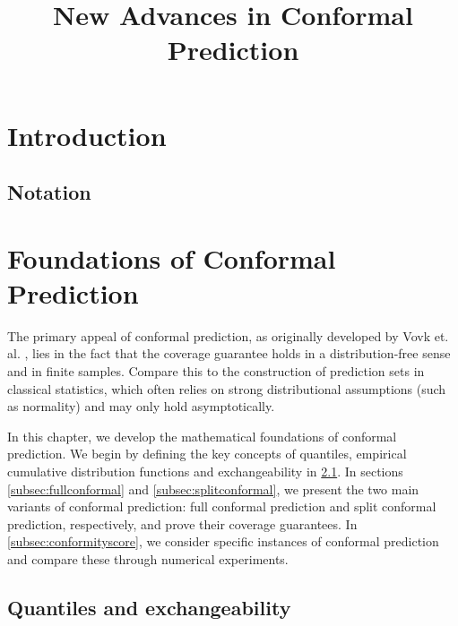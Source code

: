 \documentclass[11pt, titlepage]{article} %
\title{New Advances in Conformal Prediction}
\numberwithin{equation}{section}
\theoremstyle{definition}
\numberwithin{theorem}{section}
\numberwithin{lemma}{section}
\numberwithin{corollary}{section}
\numberwithin{proposition}{section}
\numberwithin{definition}{section}
\numberwithin{remark}{section}
\begin{document}
\maketitle


\section{Introduction}
\subsection{Notation}





\label{sec:intro}

\section{Foundations of Conformal Prediction}
\label{sec:foundations_of_CP}

The primary appeal of conformal prediction, as originally developed by Vovk et. al. \cite{vovk2005algorithmic}, lies in the fact that the coverage guarantee holds in a distribution-free sense and in finite samples. Compare this to the construction of prediction sets in classical statistics, which often relies on strong distributional assumptions (such as normality) and may only hold asymptotically. \vskip 5pt

\noindent
In this chapter, we develop the mathematical foundations of conformal prediction. We begin by defining the key concepts of quantiles, empirical cumulative distribution functions and exchangeability in \cref{subsec:quantiles_and_exchangeability}. In sections \cref{subsec:fullconformal} and \cref{subsec:splitconformal}, we present the two main variants of conformal prediction: full conformal prediction and split conformal prediction, respectively, and prove their coverage guarantees. In \cref{subsec:conformityscore}, we consider specific instances of conformal prediction and compare these through numerical experiments.

\subsection{Quantiles and exchangeability}
\label{subsec:quantiles_and_exchangeability}
\end{document}
